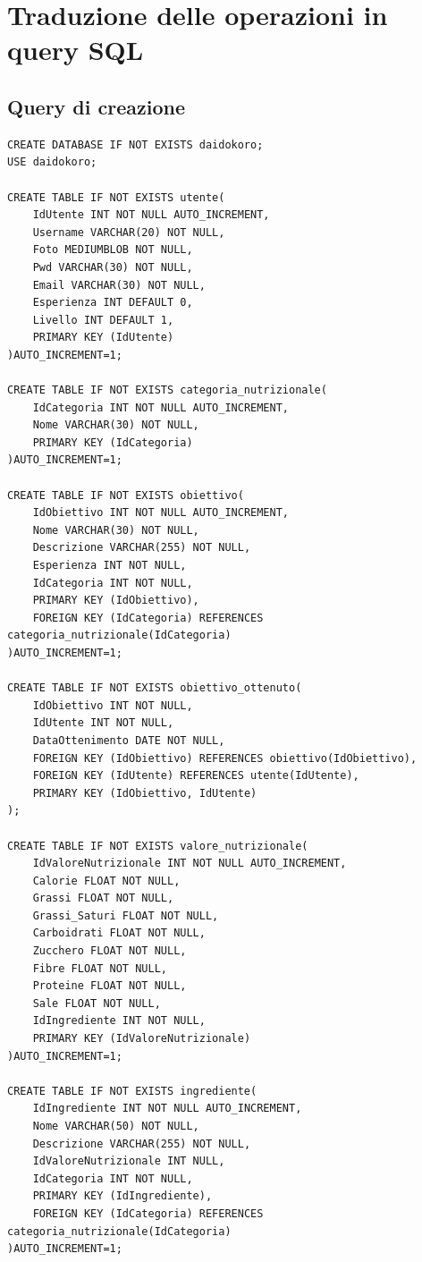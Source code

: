 ﻿\documentclass[a4paper,12pt]{report}
\begin{document}
\section{Traduzione delle operazioni in query SQL}
\subsection{Query di creazione}
\begin{verbatim}
CREATE DATABASE IF NOT EXISTS daidokoro;
USE daidokoro;

CREATE TABLE IF NOT EXISTS utente(
    IdUtente INT NOT NULL AUTO_INCREMENT,
    Username VARCHAR(20) NOT NULL,
    Foto MEDIUMBLOB NOT NULL,
    Pwd VARCHAR(30) NOT NULL,
    Email VARCHAR(30) NOT NULL,
    Esperienza INT DEFAULT 0,
    Livello INT DEFAULT 1,
    PRIMARY KEY (IdUtente)
)AUTO_INCREMENT=1;

CREATE TABLE IF NOT EXISTS categoria_nutrizionale(
    IdCategoria INT NOT NULL AUTO_INCREMENT,
    Nome VARCHAR(30) NOT NULL,
    PRIMARY KEY (IdCategoria)
)AUTO_INCREMENT=1;

CREATE TABLE IF NOT EXISTS obiettivo(
    IdObiettivo INT NOT NULL AUTO_INCREMENT,
    Nome VARCHAR(30) NOT NULL,
    Descrizione VARCHAR(255) NOT NULL,
    Esperienza INT NOT NULL,
    IdCategoria INT NOT NULL,
    PRIMARY KEY (IdObiettivo),
    FOREIGN KEY (IdCategoria) REFERENCES categoria_nutrizionale(IdCategoria)
)AUTO_INCREMENT=1;

CREATE TABLE IF NOT EXISTS obiettivo_ottenuto(
    IdObiettivo INT NOT NULL,
    IdUtente INT NOT NULL,
    DataOttenimento DATE NOT NULL,
    FOREIGN KEY (IdObiettivo) REFERENCES obiettivo(IdObiettivo),
    FOREIGN KEY (IdUtente) REFERENCES utente(IdUtente),
    PRIMARY KEY (IdObiettivo, IdUtente)
);

CREATE TABLE IF NOT EXISTS valore_nutrizionale(
    IdValoreNutrizionale INT NOT NULL AUTO_INCREMENT,
    Calorie FLOAT NOT NULL,
    Grassi FLOAT NOT NULL,
    Grassi_Saturi FLOAT NOT NULL,
    Carboidrati FLOAT NOT NULL,
    Zucchero FLOAT NOT NULL,
    Fibre FLOAT NOT NULL,
    Proteine FLOAT NOT NULL,
    Sale FLOAT NOT NULL,
    IdIngrediente INT NOT NULL,
    PRIMARY KEY (IdValoreNutrizionale)
)AUTO_INCREMENT=1;

CREATE TABLE IF NOT EXISTS ingrediente(
    IdIngrediente INT NOT NULL AUTO_INCREMENT,
    Nome VARCHAR(50) NOT NULL,
    Descrizione VARCHAR(255) NOT NULL,
    IdValoreNutrizionale INT NULL,
    IdCategoria INT NOT NULL,
    PRIMARY KEY (IdIngrediente),
    FOREIGN KEY (IdCategoria) REFERENCES categoria_nutrizionale(IdCategoria)
)AUTO_INCREMENT=1;


\end{verbatim}
\end{document}
